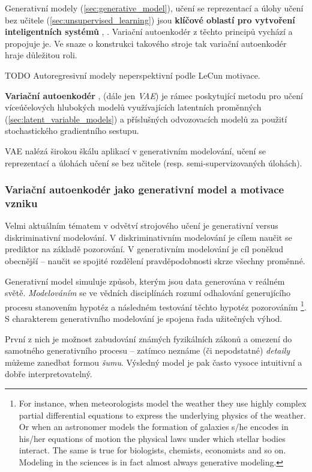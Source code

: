 Generativní modely (\autoref{sec:generative_model}), učení se reprezentací \cite{Bengio2014} a úlohy učení bez učitele (\autoref{sec:unsupervised_learning}) jsou \textbf{klíčové oblastí pro vytvoření inteligentních systémů} \cite{Kingma2019}, \cite{LeCun2022}.
Variační autoenkodér z těchto principů vychází a propojuje je. Ve snaze o konstrukci takového stroje tak variační autoenkodér hraje důležitou roli.

TODO Autoregresivní modely neperspektivní podle LeCun motivace.

\textbf{Variační autoenkodér} \cite{Kingma2014}, \cite{Rezende2014} (dále jen \emph{VAE})
je rámec poskytující metodu pro učení víceúčelových hlubokých modelů využívajících latentních proměnných (\autoref{sec:latent_variable_models})
a příslušných odvozovacích modelů
za použití stochastického gradientního sestupu. \cite{Kingma2019}

VAE nalézá širokou škálu aplikací v generativním modelování, učení se reprezentací a úlohách učení se bez učitele (resp. semi-supervizovaných úlohách).

\subsubsection{Variační autoenkodér jako generativní model a motivace vzniku}
Velmi aktuálním tématem v odvětví strojového učení je generativní versus diskriminativní modelování.
V diskriminativním modelování je cílem naučit se prediktor na základě pozorování.
V generativním modelování je cíl poněkud obecnější – naučit se spojité rozdělení pravděpodobnosti skrze všechny proměnné.

Generativní model simuluje způsob, kterým jsou data generována v reálném světě.
\emph{Modelováním} se ve vědních disciplínách rozumí odhalování generujícího procesu stanovením hypotéz a následném testování těchto hypotéz pozorováním
\footnote{For instance, when meteorologists
model the weather they use highly complex partial differential equations
to express the underlying physics of the weather. Or when an astronomer
models the formation of galaxies s/he encodes in his/her equations of
motion the physical laws under which stellar bodies interact. The same
is true for biologists, chemists, economists and so on. Modeling in the
sciences is in fact almost always generative modeling.}. 
S charakterem generativního modelování je spojena řada užitečných výhod.

První z nich je možnost zabudování známých fyzikálních zákonů a omezení do samotného generativního procesu – 
zatímco neznáme (či nepodstatné) \emph{detaily} můžeme zanedbat formou \emph{šumu}. 
Výsledný model je pak často vysoce intuitivní a dobře interpretovatelný.

